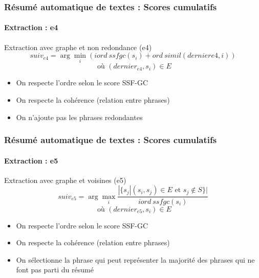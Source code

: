 \documentclass[xcolor=table]{beamer}
\begin{document}
\begin{frame}
\frametitle{Résumé automatique de textes : Scores cumulatifs}
\framesubtitle{Extraction : e4}
	
\begin{block}{Extraction avec graphe et non redondance (e4)}
	\[suiv_{e4}  =  \arg\min\limits_i (iord\ ssfgc(s_i) + ord\ simil(dernier{e4}, i))\]
	\[\text{ où } (dernier_{e4}, s_i) \in E\]
\end{block}
\begin{itemize}
	\item On respecte l'ordre selon le score SSF-GC
	\item On respecte la cohérence (relation entre phrases)
	\item On n'ajoute pas les phrases redondantes
\end{itemize}
%		
%		
	
\end{frame}

\begin{frame}
\frametitle{Résumé automatique de textes : Scores cumulatifs}
\framesubtitle{Extraction : e5}

\begin{block}{Extraction avec graphe et voisines (e5)}
	\[suiv_{e5}  =  \arg\max\limits_i \frac{|\{ s_j | (s_i, s_j) \in E \text{ et } s_j \notin S \}|}{iord\ ssfgc(s_i)}\]
	\[\text{ où } (dernier_{e5}, s_i) \in E\]
\end{block}
\begin{itemize}
	\item On respecte l'ordre selon le score SSF-GC
	\item On respecte la cohérence (relation entre phrases)
	\item On sélectionne la phrase qui peut représenter la majorité des phrases qui ne font pas parti du résumé
\end{itemize}
%		
%		
	
\end{frame}
\end{document}
